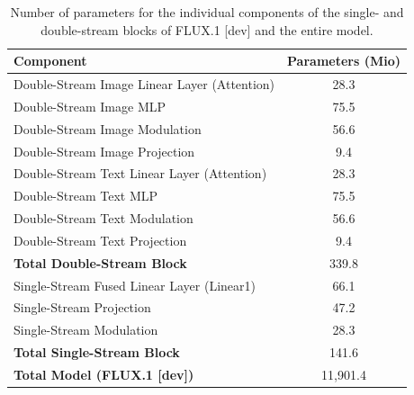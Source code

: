\begin{table}[h]
	\small
	\centering
	\caption[Parameter Count of FLUX.1 {[dev]} Components]{Number of parameters for the individual components of the single- and double-stream blocks of FLUX.1 {[dev]} and the entire model.}
	\label{tab:Flux_parameter_count}
	\renewcommand{\arraystretch}{1.2} %
	\begin{tabular}{@{}l c@{}} %
		\toprule
		\textbf{Component} & \textbf{Parameters  (Mio)} \\ 
		\midrule
		Double-Stream Image Linear Layer (Attention) & 28.3 \\
		Double-Stream Image \gls{MLP} & 75.5 \\
		Double-Stream Image Modulation & 56.6 \\
		Double-Stream Image Projection & 9.4 \\
		Double-Stream Text Linear Layer (Attention) & 28.3 \\
		Double-Stream Text \gls{MLP} & 75.5 \\
		Double-Stream Text Modulation & 56.6 \\
		Double-Stream Text Projection & 9.4 \\
		\midrule
		\textbf{Total Double-Stream Block} & 339.8 \\
		\midrule
		Single-Stream Fused Linear Layer (Linear1) & 66.1\\
		Single-Stream Projection & 47.2 \\
		Single-Stream Modulation & 28.3 \\
		\midrule
		\textbf{Total Single-Stream Block} & 141.6 \\
		\midrule
		\textbf{Total Model (FLUX.1 {[dev]})} & 11,901.4 \\
		\bottomrule
	\end{tabular}
\end{table} 




